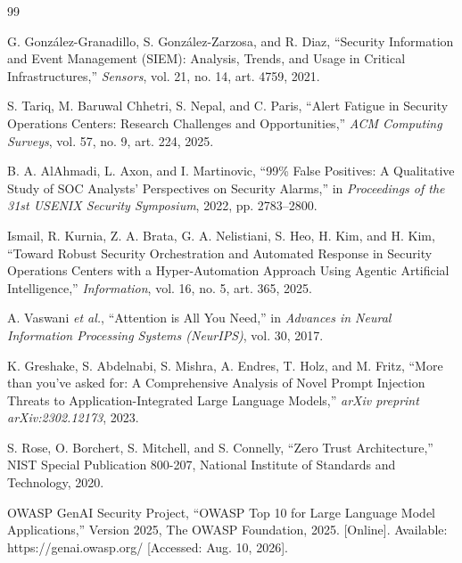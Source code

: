 \documentclass[12pt,a4paper]{report}
\begin{document}
\newpage
{} %
\setcounter{page}{1}
\singlespacing

\begin{thebibliography}{99}
\setlength{\itemsep}{0pt}
\setlength{\parskip}{0pt}

G. González-Granadillo, S. González-Zarzosa, and R. Diaz, ``Security Information and Event Management (SIEM): Analysis, Trends, and Usage in Critical Infrastructures,'' \textit{Sensors}, vol. 21, no. 14, art. 4759, 2021.

S. Tariq, M. Baruwal Chhetri, S. Nepal, and C. Paris, ``Alert Fatigue in Security Operations Centers: Research Challenges and Opportunities,'' \textit{ACM Computing Surveys}, vol. 57, no. 9, art. 224, 2025.

B. A. AlAhmadi, L. Axon, and I. Martinovic, ``99\% False Positives: A Qualitative Study of SOC Analysts' Perspectives on Security Alarms,'' in \textit{Proceedings of the 31st USENIX Security Symposium}, 2022, pp. 2783--2800.

Ismail, R. Kurnia, Z. A. Brata, G. A. Nelistiani, S. Heo, H. Kim, and H. Kim, ``Toward Robust Security Orchestration and Automated Response in Security Operations Centers with a Hyper-Automation Approach Using Agentic Artificial Intelligence,'' \textit{Information}, vol. 16, no. 5, art. 365, 2025.

A. Vaswani \textit{et al.}, ``Attention is All You Need,'' in \textit{Advances in Neural Information Processing Systems (NeurIPS)}, vol. 30, 2017.

K. Greshake, S. Abdelnabi, S. Mishra, A. Endres, T. Holz, and M. Fritz, ``More than you've asked for: A Comprehensive Analysis of Novel Prompt Injection Threats to Application-Integrated Large Language Models,'' \textit{arXiv preprint arXiv:2302.12173}, 2023.

S. Rose, O. Borchert, S. Mitchell, and S. Connelly, ``Zero Trust Architecture,'' NIST Special Publication 800-207, National Institute of Standards and Technology, 2020.

OWASP GenAI Security Project, ``OWASP Top 10 for Large Language Model Applications,'' Version 2025, The OWASP Foundation, 2025. [Online]. Available: https://genai.owasp.org/ [Accessed: Aug. 10, 2026].


\end{thebibliography}
\end{document}
